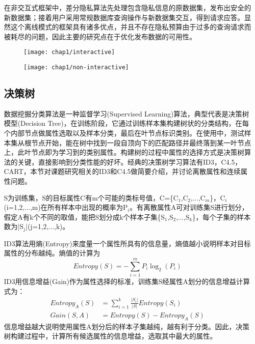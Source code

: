 在非交互式框架中，差分隐私算法先处理包含隐私信息的原数据集，发布出安全的新数据集；接着用户采用常规数据库查询操作与新数据集交互，得到请求应答。显然这个离线模式的框架具有诸多优点，并且不存在隐私预算由于过多的查询请求而被耗尽的问题，因此主要的研究点在于优化发布数据的可用性。

\begin{figure}[!htp]
	\centering
	\texttt{[image: chap1/interactive]}
\end{figure}

\begin{figure}[!htp]
	\centering
	\texttt{[image: chap1/non-interactive]}
\end{figure}


\subsection{决策树} %

数据挖掘分类算法是一种监督学习(Supervised Learning)算法，典型代表是决策树模型(Decision Tree)\cite{decision tree}，在训练阶段，它通过训练样本集构建树状的分类结构，在每个内部节点做属性选取以及样本分类，最后在叶节点标识类别。在使用中，测试样本集从根节点开始，能在树中找到一段自顶向下的匹配路径并最终落到某一叶节点上，此叶节点即为学习到的类别属性。构建树的过程中属性的选择方式是决策树算法的关键，直接影响到分类性能的好坏。经典的决策树学习算法有ID3\cite{decision tree}，C4.5\cite{c45}，CART\cite{cart}，本节对课题研究相关的ID3和C4.5做简要介绍，并讨论离散属性和连续属性问题。

\begin{exmp}
	\label{exmp_ID3}
	S为训练集，S的目标属性C有m个可能的类标号值，C=\{C$_{1}$,C$_{2}$,...,C$_{m}$\}，C$_{i}$(i=1,2,...,m)在所有样本中出现的概率为P$_{i}$。有离散属性A可对训练集S进行划分，假定A有k个不同的取值，能把S划分成k个样本子集\{S$_{1}$,S$_{2}$,...,S$_{k}$\}，每个子集的样本数为|S$_{j}$|(j=1,2,...,k)。
\end{exmp}
ID3算法用熵(Entropy)来度量一个属性所具有的信息量，熵值越小说明样本对目标属性的分布越纯。熵值的计算为
\[
	Entropy(S) = -\sum_{i=1}^{m}P_{i}\log_{2}(P_{i})
\]
ID3用信息增益(Gain)作为属性选择的标准，训练集S经属性A划分的信息增益计算式为：
\[
\begin{split}
	Entropy_{A}(S) &= \sum_{i=1}^{k}\frac{|S_{i}|}{|S|}Entropy(S_{i})\\
	Gain(S,A) &= Entropy(S)-Entropy_{A}(S)
\end{split}
\]
信息增益越大说明使用属性A划分后的样本子集越纯，越有利于分类。因此，决策树构建过程中，计算所有候选属性的信息增益，选取其中最大的属性。

